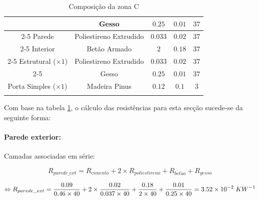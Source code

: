 \documentclass[12pt, a4paper]{article}
\begin{document}
\begin{table}[htpb]
\begin{center}
\begin{tabular}{c c c c c}
			\multirow{5}{*}{}          & Gesso                  & $0.25$                            & $0.01$                       & $37$          \\
				\cline{2-5}
			Parede                     & Poliestireno Extrudido & $0.033$                           & $0.02$                       & $37$          \\
				\cline{2-5}
			Interior                   & Betão Armado           & $2$                               & $0.18$                       & $37$          \\
				\cline{2-5}
			Estrutural ($\times 1$)    & Poliestireno Extrudido & $0.033$                           & $0.02$                       & $37$          \\
				\cline{2-5}
			                           & Gesso                  & $0.25$                            & $0.01$                       & $37$          \\
				\midrule{}

			Porta Simples ($\times 1$) & Madeira Pinus          & $0.12$                            & $0.1$                        & $3$           \\
			\bottomrule{}
		\end{tabular}
	\end{center}
	\caption{Composição da zona C}\label{tab:zona_c}
\end{table}


Com base na tabela \ref*{tab:zona_c}, o cálculo das resistências para esta secção sucede-se da seguinte forma:

\paragraph{Parede exterior:}\label{par:zona_c_ext}Camadas associadas em série:

\begin{equation}
	R_{parede\_ext} = R_{cimento} + 2 \times R_{poliestireno} + R_{bet\tilde{a}o} + R_{gesso}
	\label{eq:zona_c_ext_1}
\end{equation}

\begin{equation}
	\Leftrightarrow R_{parede\_ext} =
	\dfrac{0.09}{0.46 \times 40} +
	2 \times \dfrac{0.02}{0.037 \times 40} +
	\dfrac{0.18}{2 \times 40} +
	\dfrac{0.01}{0.25 \times 40} = 3.52 \times 10^{-2} \hspace{1mm} KW^{-1}
	\label{eq:zona_c_ext_2}
\end{equation}
\end{document}
